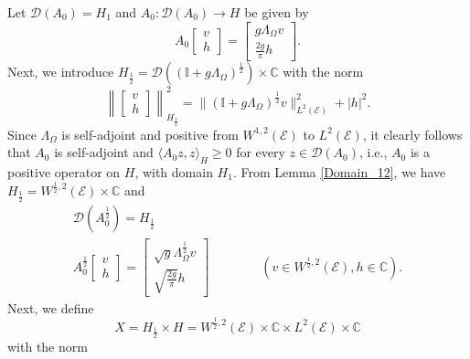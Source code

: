\documentclass{amsart} %
\numberwithin{equation}{section}
\theoremstyle{definition}
\begin{document}
Let $\mathcal{D}(A_0)=H_1$ and $A_0:\mathcal{D}(A_0)\to H$ be given by
\begin{equation}\label{def_non_cup}
    A_0\begin{bmatrix}
    v\\
    h
    \end{bmatrix}=\begin{bmatrix}
    g\Lambda_{\Omega}v\\
    \frac{2g}{\pi}h
    \end{bmatrix}.
\end{equation}
Next, we introduce $H_{\frac12}=\mathcal{D}((\mathbb{I}+g\Lambda_{\Omega})^{\frac12})\times\mathbb{C}$ with the norm 
\begin{equation}
\left\|\begin{bmatrix} v\\ h\end{bmatrix}\right\|_{H_{\frac12}}^2=\|(\mathbb{I}+g\Lambda_{\Omega})^{\frac12}v\|_{L^2(\mathcal{E})}^2+|h|^2.   
\end{equation}
Since $\Lambda_{\Omega}$ is self-adjoint and positive from $W^{1,2}(\mathcal{E})$ to $L^2(\mathcal{E})$, it clearly follows that $A_0$ is self-adjoint and $\langle A_0 z,z\rangle_H\geqslant 0$
for every $z\in \mathcal{D}(A_0)$, i.e., $A_0$ is a positive operator on $H$, with domain $H_1$. From Lemma \ref{Domain_12}, we have $H_{\frac12}=W^{\frac12,2}(\mathcal{E})\times\mathbb{C}$ and
\begin{gather}
    \mathcal{D}(A_0^{\frac12})=H_{\frac12}\\
     A_0^{\frac12}\begin{bmatrix}
    v\\
    h
    \end{bmatrix}=\begin{bmatrix}
    \sqrt{g}\Lambda_{\Omega}^{\frac12}v\\
    \sqrt{\frac{2g}{\pi}}h
    \end{bmatrix}\qquad\qquad\left(v\in W^{\frac12,2}(\mathcal{E}), h\in\mathbb{C}\right).   
\end{gather}
Next, we define 
\begin{equation}
 X=H_{\frac12}\times H= W^{\frac12,2}(\mathcal{E})\times\mathbb{C}\times L^2(\mathcal{E})\times \mathbb{C}  
\end{equation}
 with the norm
\end{document}
